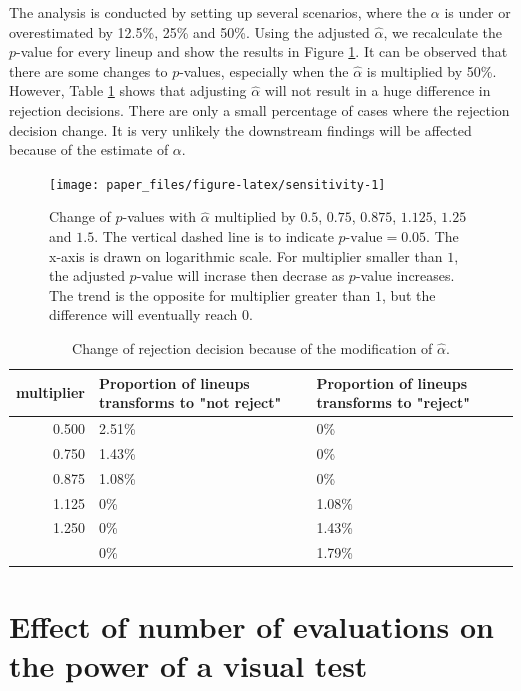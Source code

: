 \documentclass[]{interact}
\theoremstyle{plain}%
\theoremstyle{definition}
\theoremstyle{remark}
\begin{document}
The analysis is conducted by setting up several scenarios, where the
\(\alpha\) is under or overestimated by 12.5\%, 25\% and 50\%. Using the
adjusted \(\hat{\alpha}\), we recalculate the \(p\)-value for every
lineup and show the results in Figure \ref{fig:sensitivity}. It can be
observed that there are some changes to \(p\)-values, especially when
the \(\hat{\alpha}\) is multiplied by 50\%. However, Table
\ref{tab:sensitivity} shows that adjusting \(\hat{\alpha}\) will not
result in a huge difference in rejection decisions. There are only a
small percentage of cases where the rejection decision change. It is
very unlikely the downstream findings will be affected because of the
estimate of \(\alpha\).

\begin{figure}

{\centering \texttt{[image: paper\_files/figure-latex/sensitivity-1]} 

}

\caption{Change of $p$-values with $\hat{\alpha}$ multiplied by $0.5$, $0.75$, $0.875$, $1.125$, $1.25$ and $1.5$. The vertical dashed line is to indicate $p\text{-value} = 0.05$. The x-axis is drawn on logarithmic scale. For multiplier smaller than $1$, the adjusted $p$-value will incrase then decrase as $p$-value increases. The trend is the opposite for multiplier greater than $1$, but the difference will eventually reach $0$.}\label{fig:sensitivity}
\end{figure}

\begin{table}

\caption{\label{tab:sensitivity}Change of rejection decision because of the modification of $\hat{\alpha}$.}
\centering
\begin{tabular}[t]{rll}
\toprule
multiplier & Proportion of lineups transforms to "not reject" & Proportion of lineups transforms to "reject"\\
\midrule
0.500 & 2.51\% & 0\%\\
0.750 & 1.43\% & 0\%\\
0.875 & 1.08\% & 0\%\\
1.125 & 0\% & 1.08\%\\
1.250 & 0\% & 1.43\%\\
\addlinespace
1.500 & 0\% & 1.79\%\\
\bottomrule
\end{tabular}
\end{table}

\hypertarget{effect-of-number-of-evaluations-on-the-power-of-a-visual-test}{%
\section{Effect of number of evaluations on the power of a visual
test}\label{effect-of-number-of-evaluations-on-the-power-of-a-visual-test}}
\end{document}
